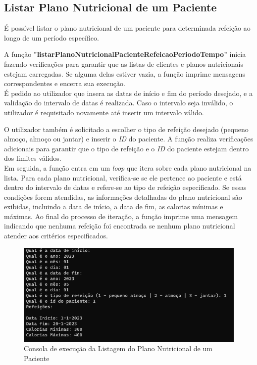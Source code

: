 \documentclass{article}
\begin{document}
\subsection{Listar Plano Nutricional de um Paciente}
É possível listar o plano nutricional de um paciente para determinada refeição ao longo de um período específico.

A função \textbf{"listarPlanoNutricionalPacienteRefeicaoPeriodoTempo"} inicia fazendo verificações para garantir que as listas de clientes e planos nutricionais estejam carregadas. Se alguma delas estiver vazia, a função imprime mensagens correspondentes e encerra sua execução.\\

É pedido ao utilizador que insera as datas de início e fim do período desejado, e a validação do intervalo de datas é realizada. Caso o intervalo seja inválido, o utilizador é requisitado novamente até inserir um intervalo válido.

O utilizador também é solicitado a escolher o tipo de refeição desejado (pequeno almoço, almoço ou jantar) e inserir o \textit{ID} do paciente. A função realiza verificações adicionais para garantir que o tipo de refeição e o \textit{ID} do paciente estejam dentro dos limites válidos.\\

Em seguida, a função entra em um \emph{loop} que itera sobre cada plano nutricional na lista. Para cada plano nutricional, verifica-se se ele pertence ao paciente e está dentro do intervalo de datas e refere-se ao tipo de refeição especificado. Se essas condições forem atendidas, as informações detalhadas do plano nutricional são exibidas, incluindo a data de início, a data de fim, as calorias mínimas e máximas.
Ao final do processo de iteração, a função imprime uma mensagem indicando que nenhuma refeição foi encontrada se nenhum plano nutricional atender aos critérios especificados.
\\ 

\begin{figure}[hbt!]
    \centering
    \includegraphics[width=0.9\linewidth]{Ponto4.png}
    \caption{Consola de execução da Listagem do Plano Nutricional de um Paciente}
    \label{fig:enter-label}
\end{figure}
\end{document}

